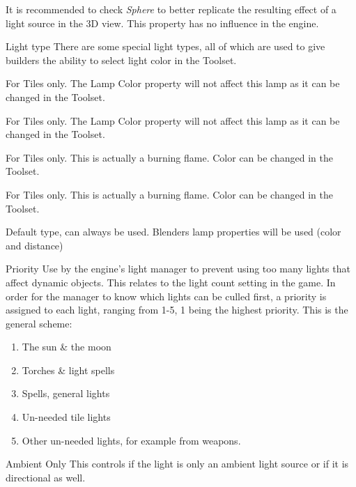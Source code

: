 It is recommended to check \textit{Sphere} to better replicate the resulting effect 
of a light source in the 3D view. This property has no influence in the engine.

\begin{propertyAurora}{Light type}
There are some special light types, all of which are used to give builders
the ability to select light color in the Toolset.
\begin{description}[leftmargin=8em,style=nextline]
    \item[Mainlight 1] For Tiles only. The Lamp Color property will not affect this lamp as it can be changed in the Toolset.
    \item[Mainlight 2] For Tiles only. The Lamp Color property will not affect this lamp as it can be changed in the Toolset.
    \item[Sourcelight 1] For Tiles only. This is actually a burning flame. Color can be changed in the Toolset.
    \item[Sourcelight 2] For Tiles only. This is actually a burning flame. Color can be changed in the Toolset.
    \item[Default] Default type, can always be used. Blenders lamp properties will be used (color and distance)
\end{description}
\end{propertyAurora}

\begin{propertyAurora}{Priority}
Use by the engine's light manager to prevent using too many lights that affect dynamic 
objects. This relates to the light count setting in the game. In order for the manager 
to know which lights can be culled first, a priority is assigned to each light, ranging from 1-5, 
1 being the highest priority. This is the general scheme:
\begin{enumerate}
    \item The sun \& the moon
    \item Torches \& light spells
    \item Spells, general lights
    \item Un-needed tile lights
    \item Other un-needed lights, for example from weapons.
\end{enumerate}
\end{propertyAurora}

\begin{propertyAurora}{Ambient Only}
This controls if the light is only an ambient light source or
if it is directional as well.
\end{propertyAurora}


